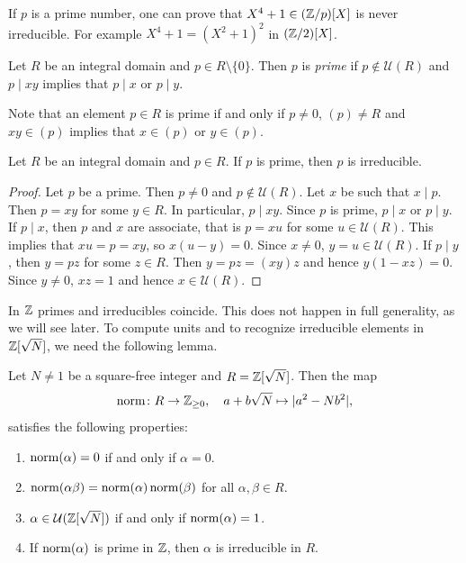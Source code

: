 If $p$ is a prime number, 
one can prove that $X^4+1\in(\mathbb{Z}/p)[X]$ is never irreducible. For example
$X^4+1=(X^2+1)^2$ in $(\mathbb{Z}/2)[X]$. 

\begin{definition}
	Let $R$ be an integral domain and $p\in R\setminus\{0\}$. Then  
	$p$ is \emph{prime} if $p\not\in\mathcal{U}(R)$ and 
	$p\mid xy$ implies that $p\mid x$ or $p\mid y$. 
\end{definition}

Note that an element $p\in R$ is prime 
if and only if $p\neq 0$, $(p)\ne R$ and 
$xy\in (p)$ implies that $x\in (p)$ or $y\in (p)$. 

\begin{proposition}
	Let $R$ be an integral domain and $p\in R$. 
	If $p$ is prime, then $p$ is irreducible. 
\end{proposition}

\begin{proof}
	Let $p$ be a prime. Then $p\ne 0$ and $p\not\in\mathcal{U}(R)$. Let $x$ be such that
	$x\mid p$. Then $p=xy$ for some $y\in R$. In particular, $p\mid xy$. 
	Since $p$ is prime, $p\mid x$ or $p\mid y$. If $p\mid x$, then
	$p$ and $x$ are associate, that is $p=xu$ for some $u\in\mathcal{U}(R)$.
	This implies that $xu=p=xy$, so $x(u-y)=0$. Since $x\ne 0$, 
	$y=u\in\mathcal{U}(R)$. 
	If $p\mid y$, then $y=pz$ for some $z\in R$. Then
	$y=pz=(xy)z$ and hence $y(1-xz)=0$. Since $y\ne 0$, 
	$xz=1$ and hence $x\in\mathcal{U}(R)$. 
\end{proof}

In $\mathbb{Z}$ primes and irreducibles coincide. This does not happen in full
generality, as we will see later. To compute units and to recognize irreducible
elements in $\mathbb{Z}[\sqrt{N}]$, we need the following lemma.

\begin{lemma}
\label{lem:norm}
Let $N\ne1$ be a square-free integer and $R=\mathbb{Z}[\sqrt{N}]$. Then 
the map 
\[
	\operatorname{norm}\colon R\to\mathbb{Z}_{\geq0},
\quad a+b\sqrt{N}\mapsto 
|a^2-Nb^2|,
\]
satisfies the following properties:
\begin{enumerate}
	\item $\operatorname{norm}(\alpha)=0$ if and only if $\alpha=0$. 
	\item $\operatorname{norm}(\alpha\beta)=\operatorname{norm}(\alpha)\operatorname{norm}(\beta)$ for all $\alpha,\beta\in R$. 
	\item $\alpha\in\mathcal{U}(\mathbb{Z}[\sqrt{N}])$ if and only if $\operatorname{norm}(\alpha)=1$. 
	\item If $\operatorname{norm}(\alpha)$ is prime in $\mathbb{Z}$, then $\alpha$ is irreducible in $R$. 
\end{enumerate}	
\end{lemma}

